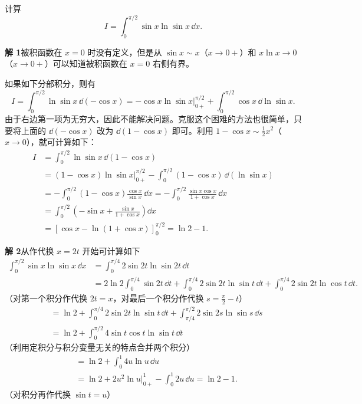 \begin{xexample}[10.4.1]
计算
\[
  I=\int_0^{\pi/2}\sin x\ln\sin x\,\dd x.
\]
\end{xexample}
\begin{xsolution}
\textbf{解 1}\quad 被积函数在 $x=0$ 时没有定义，但是从 $\sin x\sim x$（$x\to0+$）和 $x\ln x\to0$（$x\to0+$）可以知道被积函数在 $x=0$ 右侧有界。

如果如下分部积分，则有
\[
  I=\int_0^{\pi/2}\ln\sin x\,\dd(-\cos x)
  =-\cos x\ln\sin x\Big|_{0+}^{\pi/2}
  +\int_0^{\pi/2}\cos x\,\dd\ln\sin x.
\]
由于右边第一项为无穷大，因此不能解决问题。克服这个困难的方法也很简单，只要将上面的 $\dd(-\cos x)$ 改为 $\dd(1-\cos x)$ 即可。利用 $1-\cos x\sim\frac12x^2$（$x\to0$），就可计算如下：
\begin{align*}
  I&=\int_0^{\pi/2}\ln\sin x\,\dd(1-\cos x)\\
   &=(1-\cos x)\ln\sin x\Big|_{0+}^{\pi/2}
    -\int_0^{\pi/2}(1-\cos x)\,\dd(\ln\sin x)\\
   &=-\int_0^{\pi/2}(1-\cos x)\frac{\cos x}{\sin x}\,\dd x
    =-\int_0^{\pi/2}\frac{\sin x\cos x}{1+\cos x}\,\dd x\\
   &=\int_0^{\pi/2}\left(-\sin x+\frac{\sin x}{1+\cos x}\right)\dd x\\
   &=[\cos x-\ln(1+\cos x)]_0^{\pi/2}=\ln2-1.
\end{align*}

\textbf{解 2}\quad 从作代换 $x=2t$ 开始可计算如下
\begin{align*}
  \int_0^{\pi/2}\sin x\ln\sin x\,\dd x
  &=\int_0^{\pi/4}2\sin2t\ln\sin2t\,\dd t\\
  &=2\ln2\int_0^{\pi/4}\sin2t\,\dd t
    +\int_0^{\pi/4}2\sin2t\ln\sin t\,\dd t
    +\int_0^{\pi/4}2\sin2t\ln\cos t\,\dd t.
\end{align*}
（对第一个积分作代换 $2t=x$，对最后一个积分作代换 $s=\frac\pi2-t$）
\begin{align*}
  &=\ln2+\int_0^{\pi/4}2\sin2t\ln\sin t\,\dd t
    +\int_{\pi/4}^{\pi/2}2\sin2s\ln\sin s\,\dd s\\
  &=\ln2+\int_0^{\pi/2}4\sin t\cos t\ln\sin t\,\dd t
\end{align*}
（利用定积分与积分变量无关的特点合并两个积分）
\begin{align*}
  &=\ln2+\int_0^1 4u\ln u\,\dd u\\
  &=\ln2+2u^2\ln u\Big|_{0+}^1-\int_0^1 2u\,\dd u
   =\ln2-1.
\end{align*}
（对积分再作代换 $\sin t=u$）
\end{xsolution}

